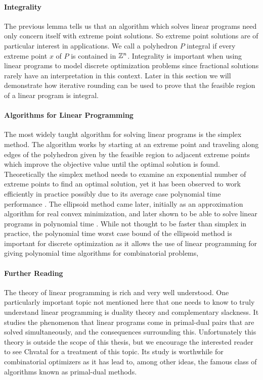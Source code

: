 \paragraph{Integrality}
The previous lemma tells us that an algorithm which solves linear programs need only concern itself with extreme point solutions. So extreme point solutions are of particular interest in applications. We call a polyhedron $P$ integral if every extreme point $x$ of $P$ is contained in $\mathbb{Z}^n$. Integrality is important when using linear programs to model discrete optimization problems since fractional solutions rarely have an interpretation in this context. Later in this section we will demonstrate how iterative rounding can be used to prove that the feasible region of a linear program is integral.
\paragraph{Algorithms for Linear Programming}
The most widely taught algorithm for solving linear programs is the simplex method\cite{dantzig1955generalized}. The algorithm works by starting at an extreme point and traveling along edges of the polyhedron given by the feasible region to adjacent extreme points which improve the objective value until the optimal solution is found. Theoretically the simplex method needs to examine an exponential number of extreme points to find an optimal solution, yet it has been observed to work efficiently in practice possibly due to its average case polynomial time performance \cite{smale1983average}. The ellipsoid method came later, initially as an approximation algorithm for real convex minimization, and later shown to be able to solve linear programs in polynomial time \cite{grotschel1981ellipsoid}. While not thought to be faster than simplex in practice, the polynomial time worst case bound of the ellipsoid method is important for discrete optimization as it allows the use of linear programming for giving polynomial time algorithms for combinatorial problems,
\paragraph{Further Reading}
The theory of linear programming is rich and very well understood. One particularly important topic not mentioned here that one needs to know to truly understand linear programming is duality theory and complementary slackness. It studies the phenomenon that linear programs come in primal-dual pairs that are solved simultaneously, and the consequences surrounding this. Unfortunately this theory is outside the scope of this thesis, but we encourage the interested reader to see Chvatal \cite{chvatal1983linear} for a treatment of this topic. Its study is worthwhile for combinatorial optimizers as it has lead to, among other ideas, the famous class of algorithms known as primal-dual methods.
